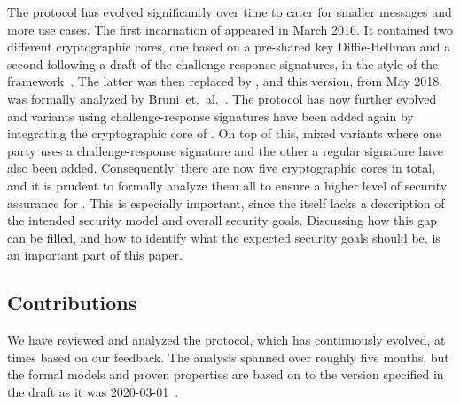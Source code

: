 \documentclass[runningheads,draft,x11names]{llncs}
\begin{document}
The \mEdhoc{} protocol has evolved significantly over time to cater for smaller
messages and more use cases.
%
The first incarnation of \mEdhoc{} appeared in March 2016.
%
It contained two different cryptographic cores, one based on a
pre-shared key Diffie-Hellman and a second following a draft of the
challenge-response signatures, in the style of the \mNoise{}
framework~\cite{perrin2016noise}.
%
The latter was then replaced by \mSigma, and this version, from May 2018, was
formally analyzed by Bruni~et.~al.~\cite{DBLP:conf/secsr/BruniJPS18}.
%
The protocol has now further evolved and variants using challenge-response
signatures have been added again by integrating the cryptographic core of
\mOptls{}.
%
On top of this, mixed variants where one party uses a challenge-response
signature and the other a regular signature have also been added.
%
Consequently, there are now five cryptographic cores in total, and it is prudent
to formally analyze them all to ensure a higher level of security assurance for
\mEdhoc.
%
This is especially important, since the \mSpec{} itself lacks a description
of the intended security model and overall security goals.
%
Discussing how this gap can be filled, and how to identify what the expected
security goals should be, is an important part of this paper.
%

\subsection{Contributions}
\label{sec:contributions}
We have reviewed and analyzed the \mEdhoc{} protocol, which has continuously
evolved, at times based on our feedback.
%
The analysis spanned over roughly five months, but the formal models and proven
properties are based on to the version specified in the draft as it was
2020-03-01~\cite{selander-lake-edhoc-01}.
%
\end{document}
